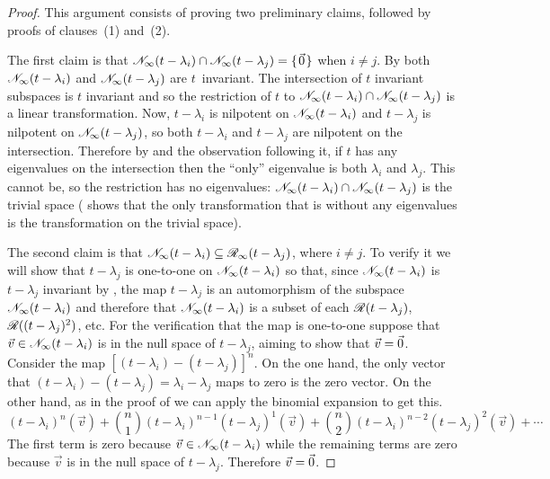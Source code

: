 \begin{proof}
This argument consists of proving
two preliminary claims, followed by proofs of clauses~(1) and~(2).

The first claim is that
\( \mathscr{N}_\infty(t-\lambda_i)\cap\mathscr{N}_\infty(t-\lambda_j)=\mbox{$\{\hspace{0.1em}\vec{0}\hspace{0.1em}\}$} \)
when \( i\neq j \).
By 
both \( \mathscr{N}_\infty(t-\lambda_i) \) and 
\( \mathscr{N}_\infty(t-\lambda_j) \) are \( t \)~invariant.
The intersection of \( t \) invariant subspaces is \( t \)
invariant and so the restriction of \( t \) to
\( \mathscr{N}_\infty(t-\lambda_i)\cap\mathscr{N}_\infty(t-\lambda_j) \)
is a linear transformation.
Now,
$t-\lambda_i$ is nilpotent on \( \mathscr{N}_\infty(t-\lambda_i) \)
and  
$t-\lambda_j$ is nilpotent on \( \mathscr{N}_\infty(t-\lambda_j) \),
so both \( t-\lambda_i \) and \( t-\lambda_j \) are 
nilpotent on the intersection.
Therefore by  and the observation
following it, if \( t \) has any eigenvalues on the intersection 
then the ``only'' eigenvalue is both
\( \lambda_i \) and \( \lambda_j \).
This cannot be, so the restriction has no eigenvalues:
\( \mathscr{N}_\infty(t-\lambda_i)\cap\mathscr{N}_\infty(t-\lambda_j) \)
is the trivial space
( shows that 
the only transformation that is without any eigenvalues is 
the transformation on the trivial space).

The second claim is that 
\( \mathscr{N}_\infty(t-\lambda_i) \subseteq \mathscr{R}_\infty(t-\lambda_j) \),
where \( i\neq j \).
To verify it we will show that \( t-\lambda_j \) is one-to-one on
\( \mathscr{N}_\infty(t-\lambda_i) \) so that, 
since \( \mathscr{N}_\infty(t-\lambda_i) \) is \( t-\lambda_j \) invariant
by ,
the map \( t-\lambda_j \) is an automorphism of the subspace
\( \mathscr{N}_\infty(t-\lambda_i) \)
and therefore that 
\( \mathscr{N}_\infty(t-\lambda_i) \)  is a subset of each
\( \mathscr{R}(t-\lambda_j) \), \( \mathscr{R}((t-\lambda_j)^2) \), etc.
For the verification that the map is one-to-one
suppose that \( \vec{v}\in\mathscr{N}_\infty(t-\lambda_i) \) is in the 
null space of \( t-\lambda_j \), aiming to show that \( \vec{v}=\vec{0} \).
Consider the map 
\( [(t-\lambda_i)-(t-\lambda_j)]^n \).
On the one hand, the only
vector that \( (t-\lambda_i)-(t-\lambda_j)=\lambda_i-\lambda_j \) maps to 
zero is the zero vector.
On the other hand, as in the proof of 
 we can 
apply the binomial expansion to get this.
\begin{equation*}
  (t-\lambda_i)^n(\vec{v})
    +\binom{n}{1}(t-\lambda_i)^{n-1}(t-\lambda_j)^1(\vec{v})
    +\binom{n}{2}(t-\lambda_i)^{n-2}(t-\lambda_j)^2(\vec{v})
    +\cdots 
\end{equation*}
The first term is zero because \( \vec{v}\in\mathscr{N}_\infty(t-\lambda_i) \)
while the remaining terms are zero because
\( \vec{v} \) is in the null space of \( t-\lambda_j \).
Therefore \( \vec{v}=\vec{0} \). 


\end{proof}
